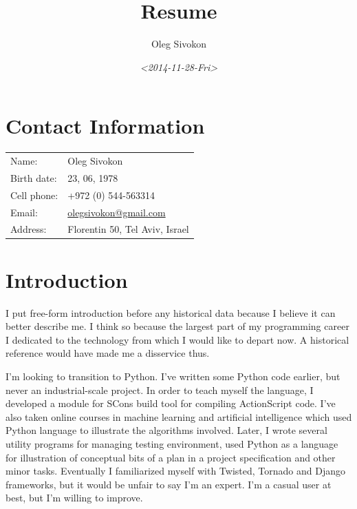 \documentclass[oneside]{memoir}
\author{Oleg Sivokon}
\date{\textit{<2014-11-28-Fri>}}
\title{Resume}
\begin{document}
\maketitle

\setlength{\parskip}{16pt plus 2pt minus 2pt}

\setcounter{tocdepth}{2}
\tableofcontents

\frontmatter

\chapter{Contact Information}
\label{sec-1}
\begin{center}
\begin{tabular}{ll}
Name: & Oleg Sivokon\\
Birth date: & 23, 06, 1978\\
Cell phone: & +972 (0) 544-563314\\
Email: & \href{mailto:olegsivokon@gmail.com}{olegsivokon@gmail.com}\\
Address: & Florentin 50, Tel Aviv, Israel\\
\end{tabular}
\end{center}
\chapter{Introduction}
\label{sec-2}
I put free-form introduction before any historical data because I believe it
can better describe me.  I think so because the largest part of my programming
career I dedicated to the technology from which I would like to depart now.  A
historical reference would have made me a disservice thus.

I'm looking to transition to Python.  I've written some Python code earlier,
but never an industrial-scale project.  In order to teach myself the language,
I developed a module for SCons build tool for compiling ActionScript code.
I've also taken online courses in machine learning and artificial intelligence
which used Python language to illustrate the algorithms involved.  Later, I
wrote several utility programs for managing testing environment, used Python
as a language for illustration of conceptual bits of a plan in a project
specification and other minor tasks.  Eventually I familiarized myself with
Twisted, Tornado and Django frameworks, but it would be unfair to say I'm an
expert.  I'm a casual user at best, but I'm willing to improve.
\end{document}
